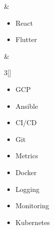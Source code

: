 \documentclass{resumeClass}
\begin{document}
{\begin{tabularx}{\linewidth}
         &
        \begin{minipage}[t]{\hsize}
            {
                \vspace{-1em}
                \begin{itemize}[leftmargin=3em,nosep,topsep=0pt]
                    \item React
                    \item Flutter
                \end{itemize}
            }
        \end{minipage}

         &
        \begin{minipage}[t]{\hsize}
            {
                \setlength{\columnsep}{-5em}
                \begin{multicols}{3}[\vspace{-1em}]
                    \begin{itemize}[leftmargin=*,nosep,topsep=0pt]
                        \item GCP
                        \item Ansible
                        \item CI/CD
                        \item Git
                        \item Metrics
                        \item Docker
                        \item Logging
                        \item Monitoring
                        \item Kubernetes
                    \end{itemize}
                \end{multicols}
            }
        \end{minipage}


\end{tabularx}}
\end{document}
